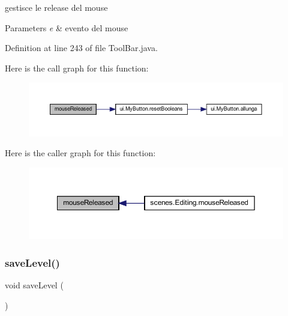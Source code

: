 gestisce le release del mouse 


\begin{DoxyParams}{Parameters}
{\em e} & evento del mouse \\
\hline
\end{DoxyParams}


Definition at line 243 of file Tool\+Bar.\+java.

Here is the call graph for this function\+:\nopagebreak
\begin{figure}[H]
\begin{center}
\leavevmode
\includegraphics[width=350pt]{classui_1_1_tool_bar_a87a07291794e15052db67f945d90853e_cgraph}
\end{center}
\end{figure}
Here is the caller graph for this function\+:\nopagebreak
\begin{figure}[H]
\begin{center}
\leavevmode
\includegraphics[width=350pt]{classui_1_1_tool_bar_a87a07291794e15052db67f945d90853e_icgraph}
\end{center}
\end{figure}
\mbox{\label{classui_1_1_tool_bar_af1c1bf274cd89c18726a992a073a7c6d}} 
\subsubsection{\texorpdfstring{save\+Level()}{saveLevel()}}
{\footnotesize\ttfamily void save\+Level (\begin{DoxyParamCaption}{ }\end{DoxyParamCaption})\hspace{0.3cm}{\ttfamily [private]}}



